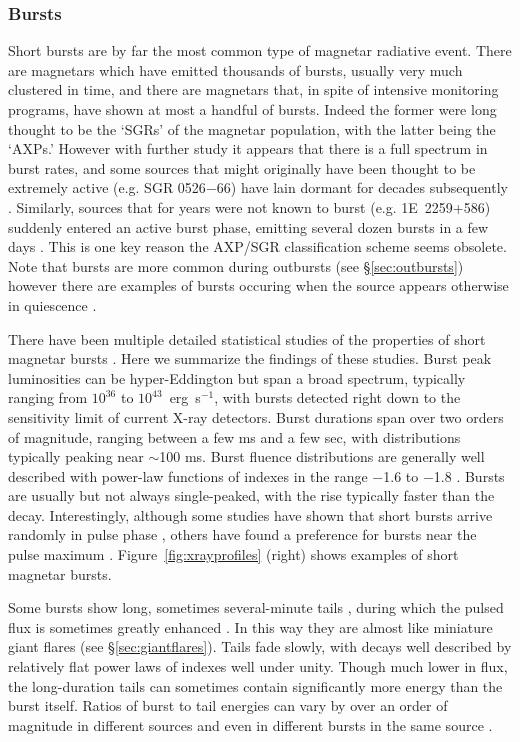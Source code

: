 \subsubsection{Bursts}
\label{sec:bursts}

Short bursts are by far the most common type of magnetar radiative event.
There are magnetars which have emitted thousands
of bursts, usually very much clustered in time, and there are magnetars that, in spite
of intensive monitoring programs, have shown at most a handful of bursts.
Indeed the former were long thought to be the `SGRs' of the magnetar population,
with the latter being the `AXPs.'  However with further study it appears that 
there is a full spectrum in burst rates, and some sources that might originally
have been thought to be extremely active (e.g. SGR 0526$-$66) have lain dormant
for decades subsequently \citep{kkm+03,tem+09}.  Similarly, sources that for years were not known to burst
(e.g. 1E~2259+586) suddenly entered an active burst phase, emitting several dozen
bursts in a few days \citep{kgw+03}.  This is one key reason the AXP/SGR classification scheme
seems obsolete.  Note that bursts are more common during outbursts (see \S\ref{sec:outbursts})
however there are examples of bursts occuring when the source appears otherwise in
quiescence \citep[e.g.][]{gkw02}.

There have been multiple detailed statistical studies of the properties of
short magnetar bursts \citep{gwk+99,gwk+00,vkg+12,lgkk13}.
Here we summarize the findings of these studies.
Burst peak luminosities can be hyper-Eddington but span a broad spectrum, typically
ranging from $10^{36}$ to $10^{43}$~erg~s$^{-1}$, with bursts detected
right down to the sensitivity limit of current X-ray detectors.  
Burst durations span over two orders of magnitude, ranging between a few ms and a few sec,
with distributions typically peaking near $\sim$100 ms.
Burst fluence distributions are generally well described with power-law functions
of indexes in the range  $-$1.6 to $-$1.8 \citep{gwk+99,gwk+00}.
Bursts are usually but not always
single-peaked, with the rise typically faster than the decay.
Interestingly, although some studies have shown that short bursts arrive
randomly in pulse phase \citep[e.g.][]{gwk+99,gwk+00}, others have found a preference
for bursts near the pulse maximum \citep[e.g.][]{gkw04}.
Figure~\ref{fig:xrayprofiles} (right) shows examples of short magnetar bursts.


Some bursts show long, sometimes several-minute tails \citep[e.g.][]{lwg+03,gwk+11,mgk+15}, during which the pulsed
flux is sometimes greatly enhanced \citep[e.g.][]{wkg+05,mgw+09,akb+14}.  In this way they are almost like miniature giant flares
(see \S\ref{sec:giantflares}).  Tails fade slowly, with decays well described by relatively flat power laws
of indexes well under unity.  Though much lower in flux, the long-duration tails
can sometimes contain significantly more energy than the burst itself.  Ratios of
burst to tail energies can vary by over an order of magnitude in different sources and even in
different bursts in the same source \citep[e.g.][]{gwk+11}.



